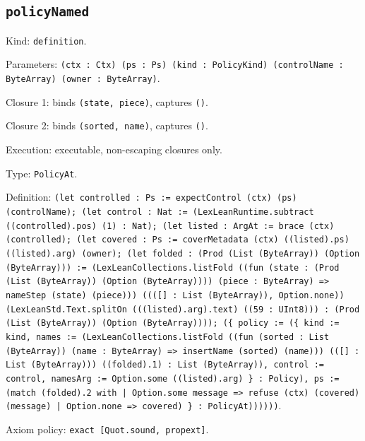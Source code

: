 \documentclass[11pt]{article}
\begin{document}
\subsection*{\texttt{policyNamed}}
\noindent Kind: \texttt{definition}.\par
\noindent Parameters: \texttt{(ctx : Ctx) (ps : Ps) (kind : PolicyKind) (controlName : ByteArray) (owner : ByteArray)}.\par
\noindent Closure 1: binds \texttt{(state, piece)}, captures \texttt{()}.\par
\noindent Closure 2: binds \texttt{(sorted, name)}, captures \texttt{()}.\par
\noindent Execution: executable, non-escaping closures only.\par
\noindent Type: \texttt{PolicyAt}.\par
\noindent Definition: \texttt{(let controlled : Ps := expectControl (ctx) (ps) (controlName); (let control : Nat := (LexLeanRuntime.subtract ((controlled).pos) (1) : Nat); (let listed : ArgAt := brace (ctx) (controlled); (let covered : Ps := coverMetadata (ctx) ((listed).ps) ((listed).arg) (owner); (let folded : (Prod (List (ByteArray)) (Option (ByteArray))) := (LexLeanCollections.listFold ((fun (state : (Prod (List (ByteArray)) (Option (ByteArray)))) (piece : ByteArray) => nameStep (state) (piece))) ((([] : List (ByteArray)), Option.none)) (LexLeanStd.Text.splitOn (((listed).arg).text) ((59 : UInt8))) : (Prod (List (ByteArray)) (Option (ByteArray)))); (\{ policy := (\{ kind := kind, names := (LexLeanCollections.listFold ((fun (sorted : List (ByteArray)) (name : ByteArray) => insertName (sorted) (name))) (([] : List (ByteArray))) ((folded).1) : List (ByteArray)), control := control, namesArg := Option.some ((listed).arg) \} : Policy), ps := (match (folded).2 with | Option.some message => refuse (ctx) (covered) (message) | Option.none => covered) \} : PolicyAt))))))}.\par
\noindent Axiom policy: \texttt{exact [Quot.sound, propext]}.\par
\end{document}
